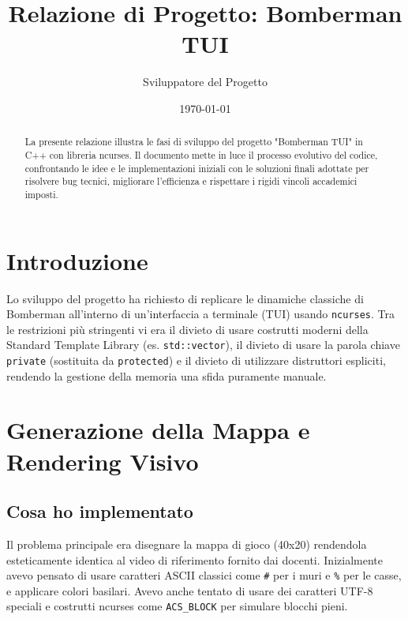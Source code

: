 \documentclass[12pt,a4paper]{article}
\title{\textbf{Relazione di Progetto: Bomberman TUI}}
\author{Sviluppatore del Progetto}
\date{\today}
\begin{document}
\maketitle

\begin{abstract}
La presente relazione illustra le fasi di sviluppo del progetto "Bomberman TUI" in C++ con libreria ncurses. Il documento mette in luce il processo evolutivo del codice, confrontando le idee e le implementazioni iniziali con le soluzioni finali adottate per risolvere bug tecnici, migliorare l'efficienza e rispettare i rigidi vincoli accademici imposti.
\end{abstract}

\tableofcontents
\newpage

\section{Introduzione}
Lo sviluppo del progetto ha richiesto di replicare le dinamiche classiche di Bomberman all'interno di un'interfaccia a terminale (TUI) usando \texttt{ncurses}. Tra le restrizioni più stringenti vi era il divieto di usare costrutti moderni della Standard Template Library (es. \texttt{std::vector}), il divieto di usare la parola chiave \texttt{private} (sostituita da \texttt{protected}) e il divieto di utilizzare distruttori espliciti, rendendo la gestione della memoria una sfida puramente manuale.

\vspace{0.5cm}

\section{Generazione della Mappa e Rendering Visivo}

\subsection{Cosa ho implementato}
Il problema principale era disegnare la mappa di gioco (40x20) rendendola esteticamente identica al video di riferimento fornito dai docenti. Inizialmente avevo pensato di usare caratteri ASCII classici come \texttt{\#} per i muri e \texttt{\%} per le casse, e applicare colori basilari. Avevo anche tentato di usare dei caratteri UTF-8 speciali e costrutti ncurses come \texttt{ACS\_BLOCK} per simulare blocchi pieni.
\end{document}
